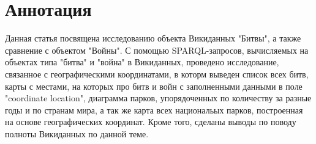 \section{Аннотация}

Данная статья посвящена исследованию объекта Викиданных "Битвы", а также сравнение с объектом "Войны". С помощью SPARQL-запросов, вычисляемых на объектах типа "битва" и "война" в Викиданных, проведено исследование, связанное с географическими координатами, в которм выведен список всех битв, карты с местами, на которых про битв и войн с заполненными данными в поле "coordinate location", диаграмма парков, упорядоченных по количеству за разные годы и по странам мира, а так же карта всех национальых парков, построенная на основе географических координат. Кроме того, сделаны выводы по поводу полноты Викиданных по данной теме.